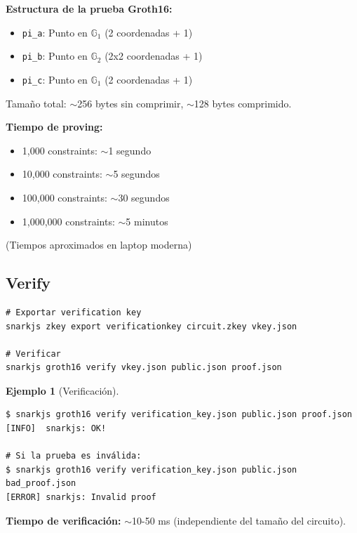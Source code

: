 \documentclass[11pt,a4paper,twoside,openright]{book}
\theoremstyle{definition}
\newtheorem{example}{Ejemplo}[chapter]
\theoremstyle{plain}
\theoremstyle{remark}
\begin{document}
\begin{mathnote}
\textbf{Estructura de la prueba Groth16:}

\begin{itemize}
    \item \texttt{pi\_a}: Punto en $\mathbb{G}_1$ (2 coordenadas + 1)
    \item \texttt{pi\_b}: Punto en $\mathbb{G}_2$ (2x2 coordenadas + 1)
    \item \texttt{pi\_c}: Punto en $\mathbb{G}_1$ (2 coordenadas + 1)
\end{itemize}

Tamaño total: $\sim$256 bytes sin comprimir, $\sim$128 bytes comprimido.

\textbf{Tiempo de proving:}
\begin{itemize}
    \item 1,000 constraints: $\sim$1 segundo
    \item 10,000 constraints: $\sim$5 segundos
    \item 100,000 constraints: $\sim$30 segundos
    \item 1,000,000 constraints: $\sim$5 minutos
\end{itemize}

(Tiempos aproximados en laptop moderna)
\end{mathnote}

\subsection{Verify}

\begin{verbatim}
# Exportar verification key
snarkjs zkey export verificationkey circuit.zkey vkey.json

# Verificar
snarkjs groth16 verify vkey.json public.json proof.json
\end{verbatim}

\begin{example}[Verificación]
\begin{verbatim}
$ snarkjs groth16 verify verification_key.json public.json proof.json
[INFO]  snarkjs: OK!

# Si la prueba es inválida:
$ snarkjs groth16 verify verification_key.json public.json bad_proof.json
[ERROR] snarkjs: Invalid proof
\end{verbatim}

\textbf{Tiempo de verificación:} $\sim$10-50 ms (independiente del tamaño del circuito).
\end{example}
\end{document}
